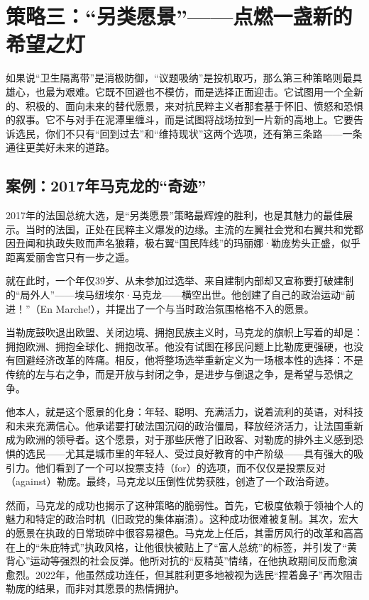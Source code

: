 \section{策略三：“另类愿景”——点燃一盏新的希望之灯}
如果说“卫生隔离带”是消极防御，“议题吸纳”是投机取巧，那么第三种策略则最具雄心，也最为艰难。它既不回避也不模仿，而是选择正面迎击。它试图用一个全新的、积极的、面向未来的替代愿景，来对抗民粹主义者那套基于怀旧、愤怒和恐惧的叙事。它不与对手在泥潭里缠斗，而是试图将战场拉到一片新的高地上。它要告诉选民，你们不只有“回到过去”和“维持现状”这两个选项，还有第三条路——一条通往更美好未来的道路。

\subsection{案例：2017年马克龙的“奇迹”}

2017年的法国总统大选，是“另类愿景”策略最辉煌的胜利，也是其魅力的最佳展示。当时的法国，正处在民粹主义爆发的边缘。主流的左翼社会党和右翼共和党都因丑闻和执政失败而声名狼藉，极右翼“国民阵线”的玛丽娜·勒庞势头正盛，似乎距离爱丽舍宫只有一步之遥。

就在此时，一个年仅39岁、从未参加过选举、来自建制内部却又宣称要打破建制的“局外人”——埃马纽埃尔·马克龙——横空出世。他创建了自己的政治运动“前进！”（En Marche!），并提出了一个与当时政治氛围格格不入的愿景。

当勒庞鼓吹退出欧盟、关闭边境、拥抱民族主义时，马克龙的旗帜上写着的却是：拥抱欧洲、拥抱全球化、拥抱改革。他没有试图在移民问题上比勒庞更强硬，也没有回避经济改革的阵痛。相反，他将整场选举重新定义为一场根本性的选择：不是传统的左与右之争，而是开放与封闭之争，是进步与倒退之争，是希望与恐惧之争。

他本人，就是这个愿景的化身：年轻、聪明、充满活力，说着流利的英语，对科技和未来充满信心。他承诺要打破法国沉闷的政治僵局，释放经济活力，让法国重新成为欧洲的领导者。这个愿景，对于那些厌倦了旧政客、对勒庞的排外主义感到恐惧的选民——尤其是城市里的年轻人、受过良好教育的中产阶级——具有强大的吸引力。他们看到了一个可以投票支持（for）的选项，而不仅仅是投票反对（against）勒庞。最终，马克龙以压倒性优势获胜，创造了一个政治奇迹。

然而，马克龙的成功也揭示了这种策略的脆弱性。首先，它极度依赖于领袖个人的魅力和特定的政治时机（旧政党的集体崩溃）。这种成功很难被复制。其次，宏大的愿景在执政的日常琐碎中很容易褪色。马克龙上任后，其雷厉风行的改革和高高在上的“朱庇特式”执政风格，让他很快被贴上了“富人总统”的标签，并引发了“黄背心”运动等强烈的社会反弹。他所对抗的“反精英”情绪，在他执政期间反而愈演愈烈。2022年，他虽然成功连任，但其胜利更多地被视为选民“捏着鼻子”再次阻击勒庞的结果，而非对其愿景的热情拥护。

